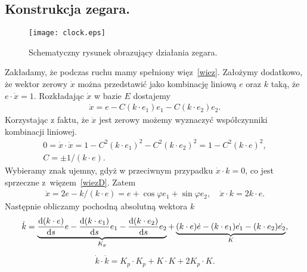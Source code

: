 \subsection{Konstrukcja zegara.}
\begin{wrapfigure}[17]{r}{4cm}
\texttt{[image: clock.eps]}
\caption{Schematyczny rysunek obrazujący działania zegara.}
\label{clock_schemat}
\end{wrapfigure}
Zakładamy, że podczas ruchu mamy spełniony więz~\eqref{wiez}.
Założymy dodatkowo, że wektor zerowy $\dot{x}$ można przedstawić
jako kombinację liniową $e$ oraz $k$ taką, że $e\cdot \dot{x} = 1$.
Rozkładając $\dot{x}$ w bazie $E$ dostajemy
\begin{align*}
\dot{x} = e - C (k\cdot e_1) e_1 - C (k\cdot e_2)e_2.
\end{align*}
Korzystając z faktu, że $\dot{x}$ jest zerowy możemy wyznaczyć
współczynniki kombinacji liniowej.
\begin{align*}
0 = \dot{x} \cdot \dot{x} = 1 - C^2 (k\cdot e_1)^2 - C^2 (k\cdot e_2)^2
= 1 - C^2 (k\cdot e)^2, \\
C= \pm 1/(k\cdot e).
\end{align*}
Wybieramy znak ujemny, gdyż w przeciwnym przypadku
$\dot{x}\cdot k = 0$, co jest sprzeczne z~więzem~\eqref{wiezD}.
 Zatem
\begin{align}
\dot{x} = 2 e - k / (k\cdot e) = 
e + \cos \varphi e_1 + \sin\varphi e_2
,\quad \dot{x}\cdot k = 2 k \cdot e .
\end{align}
Następnie obliczamy pochodną absolutną wektora $k$
\begin{align*}
\dot{k} =\underbrace{ \frac{\text{d} (k\cdot e)}{\text{d} s} e - 
\frac{\text{d} (k\cdot e_1)}{\text{d} s}e_1 -
\frac{\text{d} (k\cdot e_2)}{\text{d} s}e_2}_{K_p}
+\underbrace{(k\cdot e)\dot{e} - (k\cdot e_1)\dot{e_1} 
-(k\cdot e_2)\dot{e_2} }_{K} ,
\end{align*}
\begin{align*}
\dot{k}\cdot\dot{k} = K_p\cdot K_p + K\cdot K + 2K_p\cdot K .
\end{align*}

